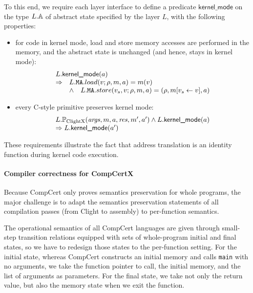 To this end, we require each layer interface to define a predicate
$\textsf{kernel\_mode}$ on the type $L.\mathbb{A}$ of abstract state specified by
the layer  $L$, with the following properties:

\begin{itemize}
\item for code in kernel mode, load and store memory accesses are
  performed in the memory, and the abstract state is unchanged
  (and hence, stays in kernel mode):
\[
\begin{array}{ll}
 \multicolumn{2}{l}{
L.\textsf{kernel\_mode}(a)} \\
\Rightarrow & L.\mat.load(v; \rho, m, a)  = m(v) \\
& \land  \quad L.\mat.store(v_s, v; \rho, m, a) = (\rho, m[v_s \leftarrow v], a)
\end{array}
\]

\item every C-style primitive preserves kernel mode:
\[
\begin{array}{l}
 L.\mathbb{P}_{\mathrm{ClightX}}(\mathit{args}, m, a, \mathit{res}, m', a')
\land {L.\textsf{kernel\_mode}(a)} \\
\Rightarrow  {L.\textsf{kernel\_mode}(a')}
\end{array}
\]
\end{itemize}%
These requirements illustrate the fact that address translation is an
identity function during kernel code execution.


\paragraph{Compiler correctness for CompCertX} 

Because CompCert only proves semantics preservation for whole
programs, the major challenge is to adapt the semantics preservation
statements of all compilation passes (from Clight to assembly) 
to per-function semantics.

The operational semantics of all CompCert languages are given through
small-step transition relations equipped with sets of whole-program
initial and final states, so we have to redesign those states to
the per-function setting. For the initial state, whereas CompCert
constructs an initial memory and calls \verb+main+ with no arguments,
we take the function pointer to call, the initial memory, and the list
of arguments as parameters. For the final state, we take not
only the return value, but also the memory state when we exit the
function.

